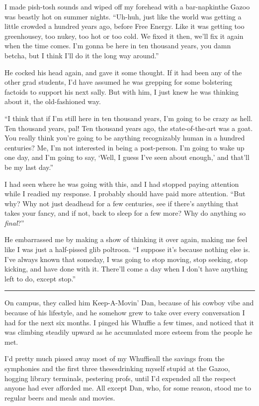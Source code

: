 I made pish-tosh sounds and wiped off my forehead with a
bar-napkin{\dash}the Gazoo was beastly hot on summer nights. “Uh-huh,
just like the world was getting a little crowded a hundred years
ago, before Free Energy. Like it was getting too greenhousey, too
nukey, too hot or too cold. We fixed it then, we'll fix it again
when the time comes. I'm gonna be here in ten thousand years, you
damn betcha, but I think I'll do it the long way around.”

He cocked his head again, and gave it some thought. If it had been
any of the other grad students, I'd have assumed he was grepping
for some bolstering factoids to support his next sally. But with
him, I just knew he was thinking about it, the old-fashioned way.

“I think that if I'm still here in ten thousand years, I'm going to
be crazy as hell. Ten thousand years, pal! Ten thousand years ago,
the state-of-the-art was a goat. You really think you're going to
be anything recognizably human in a hundred centuries? Me, I'm not
interested in being a post-person. I'm going to wake up one day,
and I'm going to say, ‘Well, I guess I've seen about enough,’ and
that'll be my last day.”

I had seen where he was going with this, and I had stopped paying
attention while I readied my response. I probably should have paid
more attention. “But why? Why not just deadhead for a few
centuries, see if there's anything that takes your fancy, and if
not, back to sleep for a few more? Why do anything so
\emph{final}?”

He embarrassed me by making a show of thinking it over again,
making me feel like I was just a half-pissed glib poltroon. “I
suppose it's because nothing else is. I've always known that
someday, I was going to stop moving, stop seeking, stop kicking,
and have done with it. There'll come a day when I don't have
anything left to do, except stop.”

\begin{center}\rule{1in}{0.4pt}\end{center}

On campus, they called him Keep-A-Movin' Dan, because of his cowboy
vibe and because of his lifestyle, and he somehow grew to take over
every conversation I had for the next six months. I pinged his
Whuffie a few times, and noticed that it was climbing steadily
upward as he accumulated more esteem from the people he met.

I'd pretty much pissed away most of my Whuffie{\dash}all the savings from
the symphonies and the first three theses{\dash}drinking myself stupid at
the Gazoo, hogging library terminals, pestering profs, until I'd
expended all the respect anyone had ever afforded me. All except
Dan, who, for some reason, stood me to regular beers and meals and
movies.

